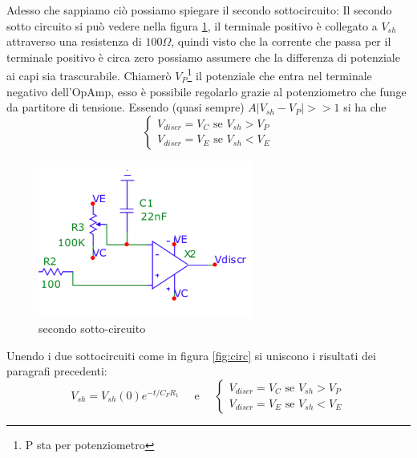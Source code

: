 \documentclass{article}
\newcommand{\vz}{V_{sh}(0)}
\begin{document}
		Adesso che sappiamo ciò possiamo spiegare il secondo sottocircuito:
		Il secondo sotto circuito si può vedere nella figura \ref{fig:circ2}, il terminale positivo è collegato a $V_{sh}$ attraverso una resistenza di $100\Omega$, quindi visto che la corrente che passa per il terminale positivo è circa zero possiamo assumere che la differenza di potenziale ai capi sia trascurabile.\newline
		Chiamerò $V_P$\footnote{P sta per potenziometro} il potenziale che entra nel terminale negativo dell'OpAmp, esso è possibile regolarlo grazie al potenziometro che funge da partitore di tensione.\newline
		Essendo (quasi sempre) $A|V_{sh}-V_P|>>1$ si ha che 
		\begin{equation}
			\begin{cases}
				V_{discr}=V_C\textrm{ se } V_{sh}>V_P\\
				V_{discr}=V_E \textrm{ se } V_{sh}<V_E
			\end{cases}
		\end{equation}
		\begin{figure}
			\centering
			\includegraphics[width=70mm]{immagini/circ1b.png}
			\caption{secondo sotto-circuito}
			\label{fig:circ2}
		\end{figure}

		Unendo i due sottocircuiti come in figura \ref{fig:circ} si uniscono i risultati dei paragrafi precedenti:
		\begin{equation}
			V_{sh}=\vz e^{-t/C_FR_1}\quad \textrm{ e }\quad 
			\begin{cases}
				V_{discr}=V_C \textrm{ se } V_{sh}>V_P\\
				V_{discr}=V_E \textrm{ se } V_{sh}<V_E
			\end{cases}
		\end{equation}
\end{document}
